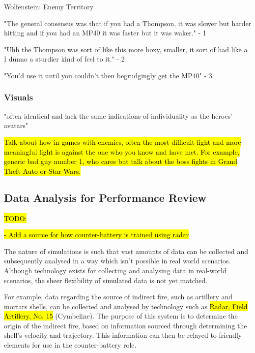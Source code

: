 \documentclass{article}
\begin{document}
 \cite{diegeticSounds1}



Wolfenstein: Enemy Territory


"The general consensus was that if you had a Thompson, it was slower but harder hitting and if you had an MP40 it was faster but it was waker." - 1

"Uhh the Thompson was sort of like this more boxy, smaller, it sort of had like a I dunno a sturdier kind of feel to it." - 2

"You'd use it until you couldn't then begrudgingly get the MP40" - 3

\subsubsection{Visuals}

"often identical and lack the same indications of individuality as
the heroes’ avatars"

\hl{Talk about how in games with enemies, often the most difficult fight and more meaningful fight is against the one who you know and have met.
For example, generic bad guy number 1, who cares but talk about the boss fights in Grand Theft Auto or Star Wars.}



\subsection{Data Analysis for Performance Review}

\hl{TODO:} 

\hl{- Add a source for how counter-battery is trained using radar}

The nature of simulations is such that vast amounts of data can be collected and subsequently analysed in a way which isn't possible in real world scenarios. Although technology exists for collecting and analysing data in real-world scenarios, the sheer flexibility of simulated data is not yet matched.

For example, data regarding the source of indirect fire, such as artillery and mortars shells, can be collected and analysed by technology such as \hl{Radar, Field Artillery, No. 15} (Cymbeline). The purpose of this system is to determine the origin of the indirect fire, based on information sourced through determining the shell's velocity and trajectory. This information can then be relayed to friendly elements for use in the counter-battery role.
\end{document}

